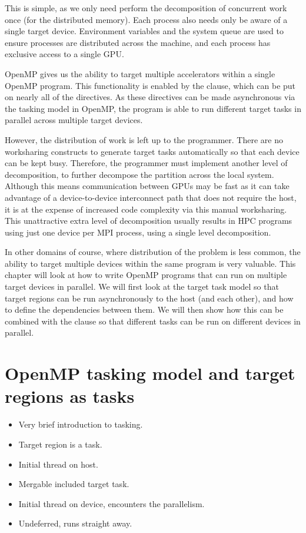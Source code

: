 This is simple, as we only need perform the decomposition of concurrent work
once (for the distributed memory). Each process also needs only be aware of a
single target device. Environment variables and the system queue are used to
ensure processes are distributed across the machine, and each process has
exclusive access to a single GPU.

OpenMP gives us the ability to target multiple accelerators within a single
OpenMP program. This functionality is enabled by the  clause, which
can be put on nearly all of the  directives. As these directives
can be made asynchronous via the tasking model in OpenMP, the program is able to
run different target tasks in parallel across multiple target devices.

However, the distribution of work is left up to the programmer. There are no
worksharing constructs to generate target tasks automatically so that each
device can be kept busy. Therefore, the programmer must implement another level
of decomposition, to further decompose the partition across the local system.
Although this means communication between GPUs may be fast as it can take
advantage of a device-to-device interconnect path that does not require the
host, it is at the expense of increased code complexity via this manual
worksharing.
This unattractive extra level of decomposition usually results in HPC programs
using just one device per MPI process, using a single level decomposition.

In other domains of course, where distribution of the problem is less common,
the ability to target multiple devices within the same program is very valuable.
This chapter will look at how to write OpenMP programs that can run on multiple
target devices in parallel. We will first look at the target task model so that
target regions can be run asynchronously to the host (and each other), and how
to define the dependencies between them.
We will then show how this can be combined with the  clause so that
different tasks can be run on different devices in parallel.

\section{OpenMP tasking model and target regions as tasks}
\begin{itemize}
  \item Very brief introduction to tasking.
  \item Target region is a task.
  \item Initial thread on host.
  \item Mergable included target task.
  \item Initial thread on device, encounters the parallelism.
  \item Undeferred, runs straight away.
\end{itemize}

